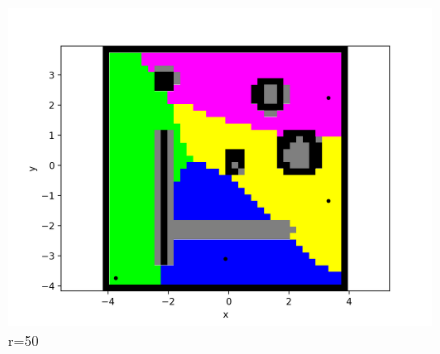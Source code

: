 \documentclass{beamer}
\begin{document}
\begin{frame}
\begin{figure}[H]
    		\begin{minipage}{0.3\textwidth}
    			\includegraphics[width=\linewidth]{DARPImages/50}
    			\caption{r=50}
    		\end{minipage}

    		\vspace*{1cm} %


\end{figure}
\end{frame}
\end{document}
